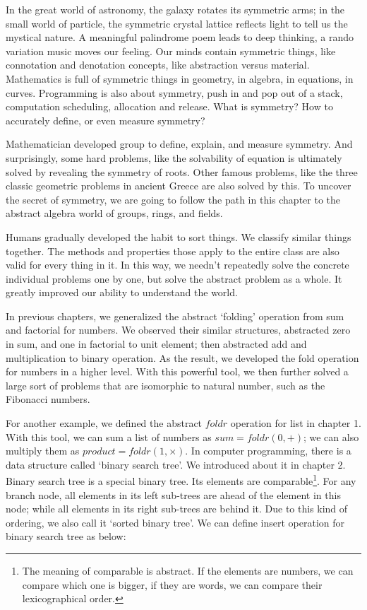 \documentclass[b5paper]{article}
\begin{document}
In the great world of astronomy, the galaxy rotates its symmetric arms; in the small world of particle, the symmetric crystal lattice reflects light to tell us the mystical nature. A meaningful palindrome poem leads to deep thinking, a rando variation music moves our feeling. Our minds contain symmetric things, like connotation and denotation concepts, like abstraction versus material. Mathematics is full of symmetric things in geometry, in algebra, in equations, in curves. Programming is also about symmetry, push in and pop out of a stack, computation scheduling, allocation and release. What is symmetry? How to accurately define, or even measure symmetry?

Mathematician developed group to define, explain, and measure symmetry. And surprisingly, some hard problems, like the solvability of equation is ultimately solved by revealing the symmetry of roots. Other famous problems, like the three classic geometric problems in ancient Greece are also solved by this. To uncover the secret of symmetry, we are going to follow the path in this chapter to the abstract algebra world of groups, rings, and fields.

Humans gradually developed the habit to sort things. We classify similar things together. The methods and properties those apply to the entire class are also valid for every thing in it. In this way, we needn't repeatedly solve the concrete individual problems one by one, but solve the abstract problem as a whole. It greatly improved our ability to understand the world.

In previous chapters, we generalized the abstract `folding' operation from sum and factorial for numbers. We observed their similar structures, abstracted zero in sum, and one in factorial to unit element; then abstracted add and multiplication to binary operation. As the result, we developed the fold operation for numbers in a higher level. With this powerful tool, we then further solved a large sort of problems that are isomorphic to natural number, such as the Fibonacci numbers.

For another example, we defined the abstract $foldr$ operation for list in chapter 1. With this tool, we can sum a list of numbers as $sum = foldr(0, +)$; we can also multiply them as $product = foldr(1, \times)$. In computer programming, there is a data structure called `binary search tree'. We introduced about it in chapter 2. Binary search tree is a special binary tree. Its elements are comparable\footnote{The meaning of comparable is abstract. If the elements are numbers, we can compare which one is bigger, if they are words, we can compare their lexicographical order.}. For any branch node, all elements in its left sub-trees are ahead of the element in this node; while all elements in its right sub-trees are behind it. Due to this kind of ordering, we also call it `sorted binary tree'. We can define insert operation for binary search tree as below:
\end{document}
